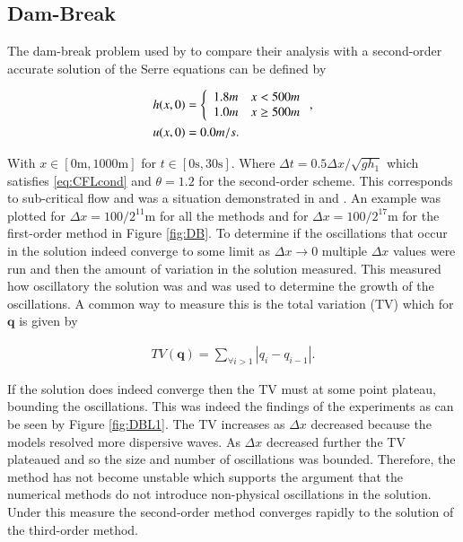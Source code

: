 \documentclass[SingleSpace,12pt,Proceedings]{Serre_ASCE}
\begin{document}
\subsection{Dam-Break}
The dam-break problem used by  to compare their analysis with a second-order accurate solution of the Serre equations can be defined by
\begin{linenomath*}
\begin{gather*}
\begin{split}
h(x,0) &= \left\lbrace \begin{array}{c c}
1.8m & x < 500m\\
1.0m & x \ge 500m\\
\end{array} \right. ,\\
u(x,0) &= 0.0m/s.
\end{split}
\end{gather*}
\end{linenomath*}
With $x \in \left[0\text{m},1000\text{m}\right]$ for $t \in \left[0\text{s},30\text{s}\right]$. Where $\Delta t = 0.5 \Delta x / \sqrt{g h_1}$ which satisfies \eqref{eq:CFLcond} and $\theta = 1.2$ for the second-order scheme. This corresponds to sub-critical flow and was a situation demonstrated in  and . An example was plotted for $\Delta x = 100 /2^{11}\text{m}$ for all the methods and for $\Delta x = 100 /2^{17}\text{m}$ for the first-order method in Figure \ref{fig:DB}. To determine if the oscillations that occur in the solution indeed converge to some limit as $\Delta x \rightarrow 0$ multiple $\Delta x$ values were run and then the amount of variation in the solution measured. This measured how oscillatory the solution was and was used to determine the growth of the oscillations. A common way to measure this is the total variation (TV) which for $\boldsymbol{q}$ is given by
\begin{linenomath*}
\begin{gather*}
TV(\boldsymbol{q}) = \sum_{\forall i >1} |q_{i} - q_{i-1}|.
\end{gather*}
\end{linenomath*}
If the solution does indeed converge then the TV must at some point plateau, bounding the oscillations. This was indeed the findings of the experiments as can be seen by Figure \ref{fig:DBL1}. The TV increases as $\Delta x$ decreased because the models resolved more dispersive waves. As $\Delta x$ decreased further the TV plateaued and so the size and number of oscillations was bounded. Therefore, the method has not become unstable which supports the argument that the numerical methods do not introduce non-physical oscillations in the solution. Under this measure the second-order method converges rapidly to the solution of the third-order method.
\end{document}
